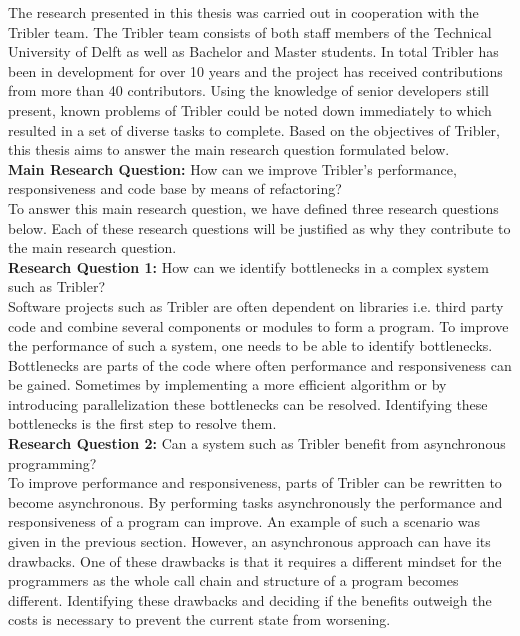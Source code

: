 The research presented in this thesis was carried out in cooperation with the Tribler team. 
The Tribler team consists of both staff members of the Technical University of Delft as well as Bachelor and Master students.
In total Tribler has been in development for over 10 years and the project has received contributions from more than 40 contributors.
Using the knowledge of senior developers still present, known problems of Tribler could be noted down immediately to which resulted in a set of diverse tasks to complete.
Based on the objectives of Tribler, this thesis aims to answer the main research question formulated below.\\

\textbf{Main Research Question:} How can we improve Tribler's performance, responsiveness and code base by means of refactoring?\\

To answer this main research question, we have defined three research questions below. Each of these research questions will be justified as why they contribute to the main research question.\\

\textbf{Research Question 1:} How can we identify bottlenecks in a complex system such as Tribler?\\

Software projects such as Tribler are often dependent on libraries i.e. third party code and combine several components or modules to form a program.
To improve the performance of such a system, one needs to be able to identify bottlenecks.
Bottlenecks are parts of the code where often performance and responsiveness can be gained.
Sometimes by implementing a more efficient algorithm or by introducing parallelization these bottlenecks can be resolved.
Identifying these bottlenecks is the first step to resolve them.\\

\textbf{Research Question 2:} Can a system such as Tribler benefit from asynchronous programming?\\

To improve performance and responsiveness, parts of Tribler can be rewritten to become asynchronous.
By performing tasks asynchronously the performance and responsiveness of a program can improve. 
An example of such a scenario was given in the previous section.
However, an asynchronous approach can have its drawbacks. 
One of these drawbacks is that it requires a different mindset for the programmers as the whole call chain and structure of a program becomes different.
Identifying these drawbacks and deciding if the benefits outweigh the costs is necessary to prevent the current state from worsening. \\

